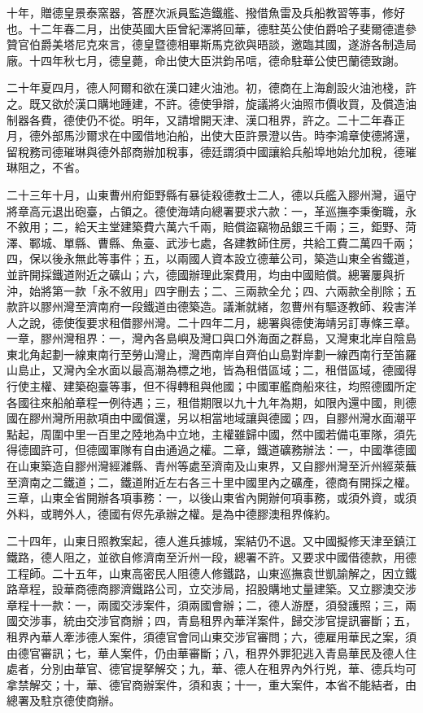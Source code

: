 \begin{pinyinscope}
十年，贈德皇景泰窯器，答歷次派員監造鐵艦、撥借魚雷及兵船教習等事，修好也。十二年春二月，出使英國大臣曾紀澤將回華，德駐英公使伯爵哈子斐爾德遣參贊官伯爵美塔尼克來言，德皇暨德相畢斯馬克欲與晤談，邀臨其國，遂游各制造局廠。十四年秋七月，德皇薨，命出使大臣洪鈞吊唁，德命駐華公使巴蘭德致謝。

二十年夏四月，德人阿爾和欲在漢口建火油池。初，德商在上海創設火油池棧，許之。既又欲於漢口購地踵建，不許。德使爭辯，旋議將火油照巿價收買，及償造油制器各費，德使仍不從。明年，又請增開天津、漢口租界，許之。二十二年春正月，德外部馬沙爾求在中國借地泊船，出使大臣許景澄以告。時李鴻章使德將還，留稅務司德璀琳與德外部商辦加稅事，德廷謂須中國讓給兵船埠地始允加稅，德璀琳阻之，不省。

二十三年十月，山東曹州府鉅野縣有暴徒殺德教士二人，德以兵艦入膠州灣，逼守將章高元退出砲臺，占領之。德使海靖向總署要求六款：一，革巡撫李秉衡職，永不敘用；二，給天主堂建築費六萬六千兩，賠償盜竊物品銀三千兩；三，鉅野、菏澤、鄆城、單縣、曹縣、魚臺、武涉七處，各建教師住房，共給工費二萬四千兩；四，保以後永無此等事件；五，以兩國人資本設立德華公司，築造山東全省鐵道，並許開採鐵道附近之礦山；六，德國辦理此案費用，均由中國賠償。總署屢與折沖，始將第一款「永不敘用」四字刪去；二、三兩款全允；四、六兩款全削除；五款許以膠州灣至濟南府一段鐵道由德築造。議漸就緒，忽曹州有驅逐教師、殺害洋人之說，德使復要求租借膠州灣。二十四年二月，總署與德使海靖另訂專條三章。一章，膠州灣租界：一，灣內各島嶼及灣口與口外海面之群島，又灣東北岸自陰島東北角起劃一線東南行至勞山灣止，灣西南岸自齊伯山島對岸劃一線西南行至笛羅山島止，又灣內全水面以最高潮為標之地，皆為租借區域；二，租借區域，德國得行使主權、建築砲臺等事，但不得轉租與他國；中國軍艦商船來往，均照德國所定各國往來船舶章程一例待遇；三，租借期限以九十九年為期，如限內還中國，則德國在膠州灣所用款項由中國償還，另以相當地域讓與德國；四，自膠州灣水面潮平點起，周圍中里一百里之陸地為中立地，主權雖歸中國，然中國若備屯軍隊，須先得德國許可，但德國軍隊有自由通過之權。二章，鐵道礦務辦法：一，中國準德國在山東築造自膠州灣經濰縣、青州等處至濟南及山東界，又自膠州灣至沂州經萊蕪至濟南之二鐵道；二，鐵道附近左右各三十里中國里內之礦產，德商有開採之權。三章，山東全省開辦各項事務：一，以後山東省內開辦何項事務，或須外資，或須外料，或聘外人，德國有侭先承辦之權。是為中德膠澳租界條約。

二十四年，山東日照教案起，德人進兵據城，案結仍不退。又中國擬修天津至鎮江鐵路，德人阻之，並欲自修濟南至沂州一段，總署不許。又要求中國借德款，用德工程師。二十五年，山東高密民人阻德人修鐵路，山東巡撫袁世凱諭解之，因立鐵路章程，設華商德商膠濟鐵路公司，立交涉局，招股購地丈量建築。又立膠澳交涉章程十一款：一，兩國交涉案件，須兩國會辦；二，德人游歷，須發護照；三，兩國交涉事，統由交涉官商辦；四，青島租界內華洋案件，歸交涉官提訊審斷；五，租界內華人牽涉德人案件，須德官會同山東交涉官審問；六，德雇用華民之案，須由德官審訊；七，華人案件，仍由華審斷；八，租界外罪犯逃入青島華民及德人住處者，分別由華官、德官提拏解交；九，華、德人在租界內外行兇，華、德兵均可拿禁解交；十，華、德官商辦案件，須和衷；十一，重大案件，本省不能結者，由總署及駐京德使商辦。


\end{pinyinscope}
